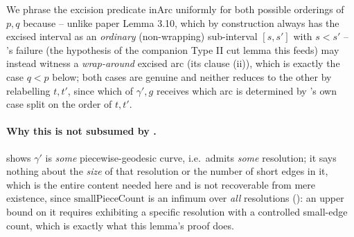 \begin{lemma}
  We phrase the excision predicate $\mathrm{inArc}$ uniformly for both possible orderings of $p,q$
  because -- unlike paper Lemma 3.10, which by construction always has the excised interval as an
  \emph{ordinary} (non-wrapping) sub-interval $[s,s']$ with $s<s'$ -- 's
  failure (the hypothesis of the companion Type II cut lemma this feeds) may instead witness a
  \emph{wrap-around} excised arc (its clause (ii)), which is exactly the case $q<p$ below; both
  cases are genuine and neither reduces to the other by relabelling $t,t'$, since which of
  $\gamma',g$ receives which arc is determined by 's own case split on the order
  of $t,t'$.

  \paragraph{Why this is not subsumed by .}  shows
  $\gamma'$ is \emph{some} piecewise-geodesic curve, i.e.\ admits \emph{some} resolution; it says
  nothing about the \emph{size} of that resolution or the number of short edges in it, which is the
  entire content needed here and is not recoverable from mere existence, since
  $\mathrm{smallPieceCount}$ is an infimum over \emph{all} resolutions ():
  an upper bound on it requires exhibiting a specific resolution with a controlled small-edge
  count, which is exactly what this lemma's proof does.
\end{lemma}

